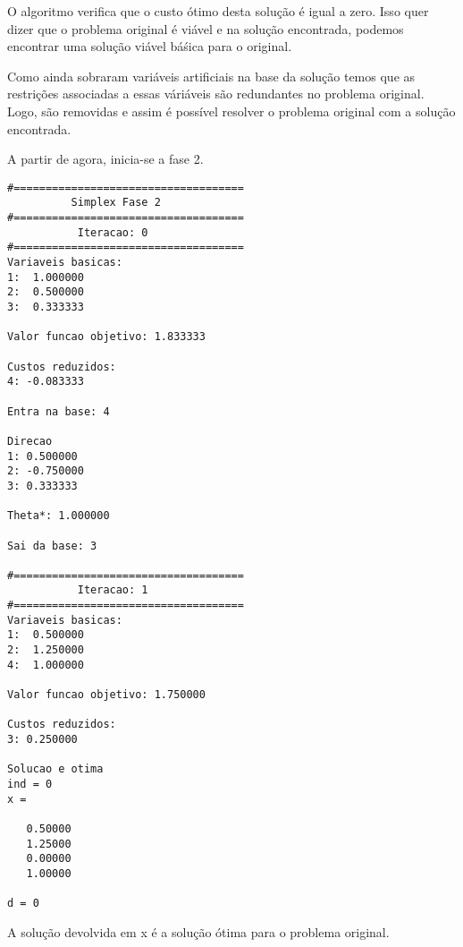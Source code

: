 \documentclass[
	12pt,				%
	openright,			%
	oneside,			%
	a4paper,			%
	english,			%
	french,				%
	spanish,			%
	brazil,				%
	]{abntex2}
\begin{document}
O algoritmo verifica que o custo ótimo desta solução é igual a zero. Isso quer dizer que o problema original é viável e na solução encontrada, podemos encontrar uma solução viável báśica para o original.

Como ainda sobraram variáveis artificiais na base da solução temos que as restrições associadas a essas váriáveis são redundantes no problema original. Logo, são removidas e assim é possível resolver o problema original com a solução encontrada.

A partir de agora, inicia-se a fase 2.

\begin{verbatim}
#====================================
          Simplex Fase 2
#====================================
           Iteracao: 0
#====================================
Variaveis basicas:
1:  1.000000
2:  0.500000
3:  0.333333

Valor funcao objetivo: 1.833333

Custos reduzidos:
4: -0.083333

Entra na base: 4

Direcao
1: 0.500000
2: -0.750000
3: 0.333333

Theta*: 1.000000

Sai da base: 3

#====================================
           Iteracao: 1
#====================================
Variaveis basicas:
1:  0.500000
2:  1.250000
4:  1.000000

Valor funcao objetivo: 1.750000

Custos reduzidos:
3: 0.250000

Solucao e otima 
ind = 0
x =

   0.50000
   1.25000
   0.00000
   1.00000

d = 0
\end{verbatim}
A solução devolvida em x é a solução ótima para o problema original.
%
%
%
\end{document}
